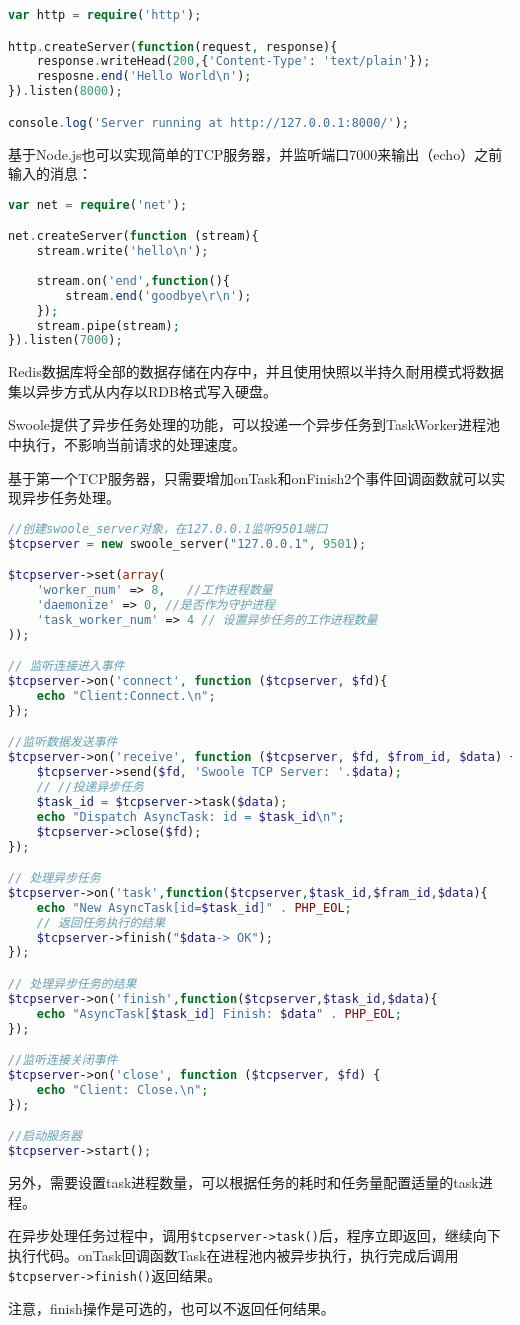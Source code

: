 \begin{lstlisting}[language=PHP]
var http = require('http');

http.createServer(function(request, response){
	response.writeHead(200,{'Content-Type': 'text/plain'});
	resposne.end('Hello World\n');
}).listen(8000);

console.log('Server running at http://127.0.0.1:8000/');
\end{lstlisting}

基于Node.js也可以实现简单的TCP服务器，并监听端口7000来输出（echo）之前输入的消息：

\begin{lstlisting}[language=PHP]
var net = require('net');

net.createServer(function (stream){
	stream.write('hello\n');
	
	stream.on('end',function(){
		stream.end('goodbye\r\n');
	});
	stream.pipe(stream);
}).listen(7000);
\end{lstlisting}

Redis数据库将全部的数据存储在内存中，并且使用快照以半持久耐用模式将数据集以异步方式从内存以RDB格式写入硬盘。

Swoole提供了异步任务处理的功能，可以投递一个异步任务到TaskWorker进程池中执行，不影响当前请求的处理速度。

基于第一个TCP服务器，只需要增加onTask和onFinish2个事件回调函数就可以实现异步任务处理。



\begin{lstlisting}[language=PHP]
//创建swoole_server对象，在127.0.0.1监听9501端口
$tcpserver = new swoole_server("127.0.0.1", 9501);

$tcpserver->set(array(
    'worker_num' => 8,   //工作进程数量
    'daemonize' => 0, //是否作为守护进程
    'task_worker_num' => 4 // 设置异步任务的工作进程数量
));

// 监听连接进入事件
$tcpserver->on('connect', function ($tcpserver, $fd){
    echo "Client:Connect.\n";
});

//监听数据发送事件
$tcpserver->on('receive', function ($tcpserver, $fd, $from_id, $data) {
    $tcpserver->send($fd, 'Swoole TCP Server: '.$data);
    // //投递异步任务
    $task_id = $tcpserver->task($data);
    echo "Dispatch AsyncTask: id = $task_id\n";
    $tcpserver->close($fd);
});

// 处理异步任务
$tcpserver->on('task',function($tcpserver,$task_id,$fram_id,$data){
	echo "New AsyncTask[id=$task_id]" . PHP_EOL;
	// 返回任务执行的结果
	$tcpserver->finish("$data-> OK");
});

// 处理异步任务的结果
$tcpserver->on('finish',function($tcpserver,$task_id,$data){
	echo "AsyncTask[$task_id] Finish: $data" . PHP_EOL;
});

//监听连接关闭事件
$tcpserver->on('close', function ($tcpserver, $fd) {
    echo "Client: Close.\n";
});

//启动服务器
$tcpserver->start();
\end{lstlisting}


另外，需要设置task进程数量，可以根据任务的耗时和任务量配置适量的task进程。


在异步处理任务过程中，调用\texttt{\$tcpserver->task()}后，程序立即返回，继续向下执行代码。onTask回调函数Task在进程池内被异步执行，执行完成后调用\texttt{\$tcpserver->finish()}返回结果。

注意，finish操作是可选的，也可以不返回任何结果。



